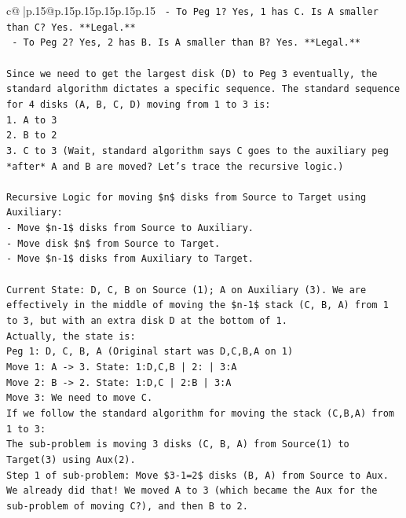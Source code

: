 \documentclass{article}
\begin{document}
{\begin{supertabular}{c@{$\;$}|p{.15\linewidth}@{}p{.15\linewidth}p{.15\linewidth}p{.15\linewidth}p{.15\linewidth}p{.15\linewidth}}
{{{\texttt{   {-} To Peg 1? Yes, 1 has C. Is A smaller than C? Yes. **Legal.**} \\
\texttt{   {-} To Peg 2? Yes, 2 has B. Is A smaller than B? Yes. **Legal.**} \\
\\ 
\texttt{Since we need to get the largest disk (D) to Peg 3 eventually, the standard algorithm dictates a specific sequence. The standard sequence for 4 disks (A, B, C, D) moving from 1 to 3 is:} \\
\texttt{1. A to 3} \\
\texttt{2. B to 2} \\
\texttt{3. C to 3 (Wait, standard algorithm says C goes to the auxiliary peg *after* A and B are moved? Let's trace the recursive logic.)} \\
\\ 
\texttt{Recursive Logic for moving \$n\$ disks from Source to Target using Auxiliary:} \\
\texttt{{-} Move \$n{-}1\$ disks from Source to Auxiliary.} \\
\texttt{{-} Move disk \$n\$ from Source to Target.} \\
\texttt{{-} Move \$n{-}1\$ disks from Auxiliary to Target.} \\
\\ 
\texttt{Current State: D, C, B on Source (1); A on Auxiliary (3). We are effectively in the middle of moving the \$n{-}1\$ stack (C, B, A) from 1 to 3, but with an extra disk D at the bottom of 1.} \\
\texttt{Actually, the state is:} \\
\texttt{Peg 1: D, C, B, A (Original start was D,C,B,A on 1)} \\
\texttt{Move 1: A {-}> 3. State: 1:D,C,B | 2: | 3:A} \\
\texttt{Move 2: B {-}> 2. State: 1:D,C | 2:B | 3:A} \\
\texttt{Move 3: We need to move C.} \\
\texttt{If we follow the standard algorithm for moving the stack (C,B,A) from 1 to 3:} \\
\texttt{The sub{-}problem is moving 3 disks (C, B, A) from Source(1) to Target(3) using Aux(2).} \\
\texttt{Step 1 of sub{-}problem: Move \$3{-}1=2\$ disks (B, A) from Source to Aux.} \\
\texttt{We already did that! We moved A to 3 (which became the Aux for the sub{-}problem of moving C?), and then B to 2.} \\
}}}
\end{supertabular}}
\end{document}
